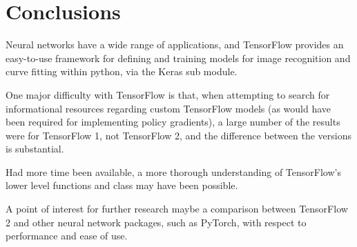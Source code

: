 \chapter{Conclusions}

Neural networks have a wide range of applications, and TensorFlow provides an
easy-to-use framework for defining and training models for image recognition and
curve fitting within python, via the Keras sub module.

One major difficulty with TensorFlow is that, when attempting to search for
informational resources regarding custom TensorFlow models (as would have been
required for implementing policy gradients), a large number of the results were
for TensorFlow 1, not TensorFlow 2, and the difference between the versions is
substantial.

Had more time been available, a more thorough understanding of TensorFlow's
lower level functions and class may have been possible.

A point of interest for further research maybe a comparison between TensorFlow 2
and other neural network packages, such as PyTorch, with respect to performance
and ease of use.
